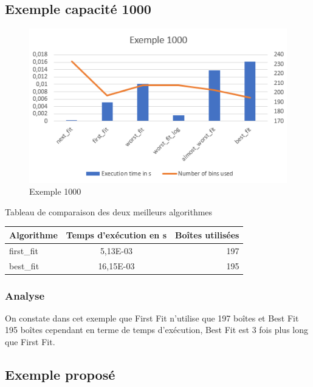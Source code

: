 \documentclass{article}
\begin{document}
\subsection{Exemple capacité 1000}
\begin{figure}[h]
\begin{center}
\includegraphics{exemple1000.png}
\end{center}
\caption{Exemple 1000}
\end{figure}

\begin{center}
Tableau de comparaison des deux meilleurs algorithmes

\begin{tabular}{|l|c|r|}
  \hline
  Algorithme & Temps d'exécution en s & Boîtes utilisées \\
  \hline
  first\_fit & 5,13E-03 & 197 \\
  best\_fit & 16,15E-03  & 195 \\
  \hline
\end{tabular}
\end{center}


\subsubsection{Analyse}
On constate dans cet exemple que First Fit n'utilise que 197 boîtes et Best Fit 195 boîtes cependant en terme de temps d'exécution,
Best Fit est 3 fois plus long que First Fit.

\clearpage
\subsection{Exemple proposé}
\end{document}
